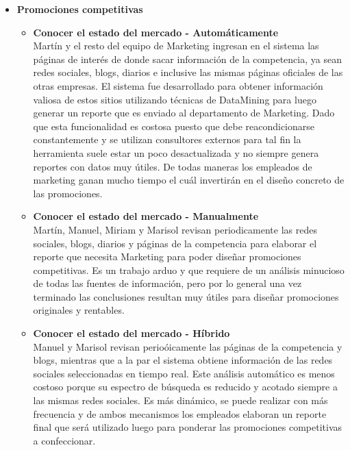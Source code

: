 \begin{itemize}
  \item \textbf{Promociones competitivas}
  \begin{itemize}
    \item \textbf{Conocer el estado del mercado - Automáticamente} \\
      Martín y el resto del equipo de Marketing ingresan en el sistema las páginas de interés de donde sacar información de la competencia, ya sean redes sociales, blogs, diarios e inclusive las mismas páginas oficiales de las otras empresas. El sistema fue desarrollado para obtener información valiosa de estos sitios utilizando técnicas de DataMining para luego generar un reporte que es enviado al departamento de Marketing. Dado que esta funcionalidad es costosa puesto que debe reacondicionarse constantemente y se utilizan consultores externos para tal fin la herramienta suele estar un poco desactualizada y no siempre genera reportes con datos muy útiles. De todas maneras los empleados de marketing ganan mucho tiempo el cuál invertirán en el diseño concreto de las promociones.
    \item \textbf{Conocer el estado del mercado - Manualmente} \\
      Martín, Manuel, Miriam y Marisol revisan periodicamente las redes sociales, blogs, diarios y páginas de la competencia para elaborar el reporte que necesita Marketing para poder diseñar promociones competitivas. Es un trabajo arduo y que requiere de un análisis minucioso de todas las fuentes de información, pero por lo general una vez terminado las conclusiones resultan muy útiles para diseñar promociones originales y rentables.
    \item \textbf{Conocer el estado del mercado - Híbrido} \\
      Manuel y Marisol revisan perioóicamente las páginas de la competencia y blogs, mientras que a la par el sistema obtiene información de las redes sociales seleccionadas en tiempo real. Este análisis automático es menos costoso porque su espectro de búsqueda es reducido y acotado siempre a las mismas redes sociales. Es más dinámico, se puede realizar con más frecuencia y de ambos mecanismos los empleados elaboran un reporte final que será utilizado luego para ponderar las promociones competitivas a confeccionar.
  \end{itemize}


\end{itemize}
